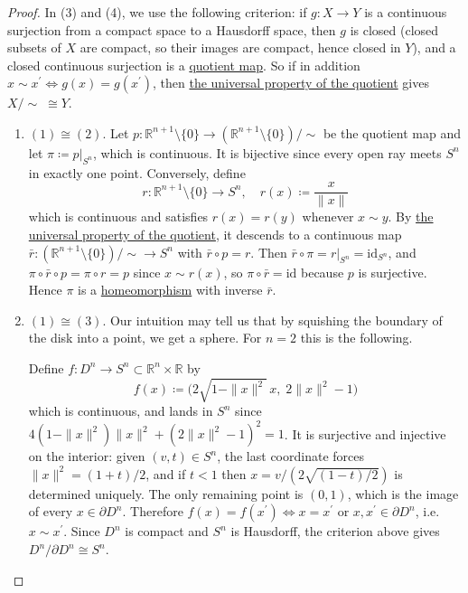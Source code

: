 	\begin{proof}
		In (3) and (4), we use the following criterion: if $g: X \rightarrow Y$ is a continuous surjection from a compact space to a Hausdorff space, then $g$ is closed (closed subsets of $X$ are compact, so their images are compact, hence closed in $Y$), and a closed continuous surjection is a \hyperref[def:quotient-map]{quotient map}. So if in addition $x \sim x^\prime \iff g(x) = g(x^\prime)$, then \hyperref[thm:quotient_homeomorphism]{the universal property of the quotient} gives $X/{\sim} \; \cong Y$. 
		\begin{enumerate}
			\item $(1) \cong (2)$. Let $p: \mathbb{R}^{n+1} \setminus \{0\} \rightarrow (\mathbb{R}^{n+1} \setminus \{0\})/{\sim}$ be the quotient map and let $\pi \coloneqq p|_{S^n}$, which is continuous. It is bijective since every open ray meets $S^n$ in exactly one point. Conversely, define 
				\begin{equation}
					r: \mathbb{R}^{n+1} \setminus \{0\} \rightarrow S^n, \quad r(x) \coloneqq \frac{x}{\|x\|}
				\end{equation}
				which is continuous and satisfies $r(x) = r(y)$ whenever $x \sim y$. By \hyperref[thm:universal_quotient]{the universal property of the quotient}, it descends to a continuous map $\bar{r}: (\mathbb{R}^{n+1} \setminus \{0\})/{\sim} \rightarrow S^n$ with $\bar{r} \circ p = r$. Then $\bar{r} \circ \pi = r|_{S^n} = \mathrm{id}_{S^n}$, and $\pi \circ \bar{r} \circ p = \pi \circ r = p$ since $x \sim r(x)$, so $\pi \circ \bar{r} = \mathrm{id}$ because $p$ is surjective. Hence $\pi$ is a \hyperref[def:homeomorphism]{homeomorphism} with inverse $\bar{r}$. 

			\item $(1) \cong (3)$. Our intuition may tell us that by squishing the boundary of the disk into a point, we get a sphere. For $n = 2$ this is the following. 


				Define $f: D^n \rightarrow S^n \subset \mathbb{R}^n \times \mathbb{R}$ by 
				\begin{equation}
					f(x) \coloneqq \Big( 2 \sqrt{1 - \|x\|^2} \, x, \; 2\|x\|^2 - 1 \Big)
				\end{equation}
				which is continuous, and lands in $S^n$ since $4(1 - \|x\|^2)\|x\|^2 + (2 \|x\|^2 - 1)^2 = 1$. It is surjective and injective on the interior: given $(v, t) \in S^n$, the last coordinate forces $\|x\|^2 = (1 + t)/2$, and if $t < 1$ then $x = v / (2\sqrt{(1-t)/2})$ is determined uniquely. The only remaining point is $(0, 1)$, which is the image of every $x \in \partial D^n$. Therefore $f(x) = f(x^\prime) \iff x = x^\prime$ or $x, x^\prime \in \partial D^n$, i.e. $x \sim x^\prime$. Since $D^n$ is compact and $S^n$ is Hausdorff, the criterion above gives $D^n/\partial D^n \cong S^n$. 


\end{enumerate}
\end{proof}
